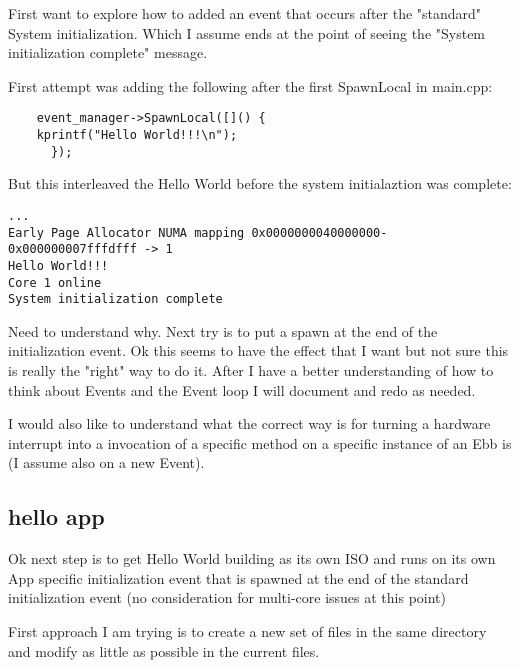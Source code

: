 \documentclass[11pt]{report}
\begin{document}
First want to explore how to added an event that occurs after
the "standard" System initialization.  Which I assume ends
at the point of seeing the "System initialization complete" message.

First attempt was adding the following after the first SpawnLocal in main.cpp:
\begin{verbatim}
    event_manager->SpawnLocal([]() {
	kprintf("Hello World!!!\n");
      });
\end{verbatim}

But this interleaved the Hello World before the system initialaztion was complete:
\begin{verbatim}
...
Early Page Allocator NUMA mapping 0x0000000040000000-0x000000007fffdfff -> 1
Hello World!!!
Core 1 online
System initialization complete
\end{verbatim}

Need to understand why.
Next try is to put a spawn at the end of the initialization event.
Ok this seems to have the effect that I want but not sure this is really 
the "right" way to do it.  After I have a better understanding of how to 
think about Events and the Event loop I will document and redo as needed.

I would also like to understand what the correct way is for turning a hardware
interrupt into a invocation of a specific method on a specific instance of an Ebb is (I assume also on a new Event).

\subsection{hello app}
Ok next step is to get Hello World building as its own ISO and runs
on its own App specific initialization event that is spawned at the 
end of the standard initialization event (no consideration for 
multi-core issues at this point)

First approach I am trying is to create a new set of files in the same
directory and modify as little as possible in the current files.
\end{document}
